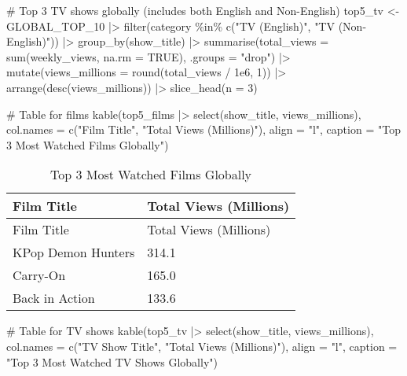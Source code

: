 \documentclass[
  12pt,
  letterpaper,
  DIV=11,
  numbers=noendperiod]{scrartcl}
\newenvironment{Shaded}{\begin{snugshade}}{\end{snugshade}}
\newcommand{\AttributeTok}[1]{\textcolor[rgb]{0.40,0.45,0.13}{#1}}
\newcommand{\CommentTok}[1]{\textcolor[rgb]{0.37,0.37,0.37}{#1}}
\newcommand{\ConstantTok}[1]{\textcolor[rgb]{0.56,0.35,0.01}{#1}}
\newcommand{\DecValTok}[1]{\textcolor[rgb]{0.68,0.00,0.00}{#1}}
\newcommand{\FloatTok}[1]{\textcolor[rgb]{0.68,0.00,0.00}{#1}}
\newcommand{\FunctionTok}[1]{\textcolor[rgb]{0.28,0.35,0.67}{#1}}
\newcommand{\NormalTok}[1]{\textcolor[rgb]{0.00,0.23,0.31}{#1}}
\newcommand{\OtherTok}[1]{\textcolor[rgb]{0.00,0.23,0.31}{#1}}
\newcommand{\SpecialCharTok}[1]{\textcolor[rgb]{0.37,0.37,0.37}{#1}}
\newcommand{\StringTok}[1]{\textcolor[rgb]{0.13,0.47,0.30}{#1}}
\begin{document}
\begin{Shaded}
\begin{Highlighting}[]
\CommentTok{\# Top 3 TV shows globally (includes both English and Non{-}English)}
\NormalTok{top5\_tv }\OtherTok{\textless{}{-}}\NormalTok{ GLOBAL\_TOP\_10 }\SpecialCharTok{|\textgreater{}}
  \FunctionTok{filter}\NormalTok{(category }\SpecialCharTok{\%in\%} \FunctionTok{c}\NormalTok{(}\StringTok{"TV (English)"}\NormalTok{, }\StringTok{"TV (Non{-}English)"}\NormalTok{)) }\SpecialCharTok{|\textgreater{}}
  \FunctionTok{group\_by}\NormalTok{(show\_title) }\SpecialCharTok{|\textgreater{}}
  \FunctionTok{summarise}\NormalTok{(}\AttributeTok{total\_views =} \FunctionTok{sum}\NormalTok{(weekly\_views, }\AttributeTok{na.rm =} \ConstantTok{TRUE}\NormalTok{), }\AttributeTok{.groups =} \StringTok{"drop"}\NormalTok{) }\SpecialCharTok{|\textgreater{}}
  \FunctionTok{mutate}\NormalTok{(}\AttributeTok{views\_millions =} \FunctionTok{round}\NormalTok{(total\_views }\SpecialCharTok{/} \FloatTok{1e6}\NormalTok{, }\DecValTok{1}\NormalTok{)) }\SpecialCharTok{|\textgreater{}}
  \FunctionTok{arrange}\NormalTok{(}\FunctionTok{desc}\NormalTok{(views\_millions)) }\SpecialCharTok{|\textgreater{}}
  \FunctionTok{slice\_head}\NormalTok{(}\AttributeTok{n =} \DecValTok{3}\NormalTok{)}

\CommentTok{\# Table for films}
\FunctionTok{kable}\NormalTok{(top5\_films }\SpecialCharTok{|\textgreater{}} \FunctionTok{select}\NormalTok{(show\_title, views\_millions),}
      \AttributeTok{col.names =} \FunctionTok{c}\NormalTok{(}\StringTok{"Film Title"}\NormalTok{, }\StringTok{"Total Views (Millions)"}\NormalTok{),}
      \AttributeTok{align =} \StringTok{"l"}\NormalTok{,}
      \AttributeTok{caption =} \StringTok{"Top 3 Most Watched Films Globally"}\NormalTok{)}
\end{Highlighting}
\end{Shaded}

\begin{longtable}[]{@{}ll@{}}
\caption{Top 3 Most Watched Films Globally}\tabularnewline
\toprule\noalign{}
Film Title & Total Views (Millions) \\
\midrule\noalign{}
\endfirsthead
\toprule\noalign{}
Film Title & Total Views (Millions) \\
\midrule\noalign{}
\endhead
\bottomrule\noalign{}
\endlastfoot
KPop Demon Hunters & 314.1 \\
Carry-On & 165.0 \\
Back in Action & 133.6 \\
\end{longtable}

\begin{Shaded}
\begin{Highlighting}[]
\CommentTok{\# Table for TV shows}
\FunctionTok{kable}\NormalTok{(top5\_tv }\SpecialCharTok{|\textgreater{}} \FunctionTok{select}\NormalTok{(show\_title, views\_millions),}
      \AttributeTok{col.names =} \FunctionTok{c}\NormalTok{(}\StringTok{"TV Show Title"}\NormalTok{, }\StringTok{"Total Views (Millions)"}\NormalTok{),}
      \AttributeTok{align =} \StringTok{"l"}\NormalTok{,}
      \AttributeTok{caption =} \StringTok{"Top 3 Most Watched TV Shows Globally"}\NormalTok{)}
\end{Highlighting}
\end{Shaded}
\end{document}
